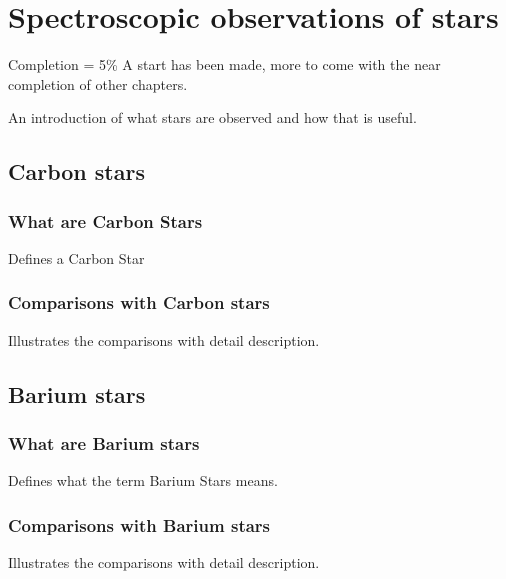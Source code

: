 \chapter{Spectroscopic observations of stars}

Completion = 5\%
A start has been made, more to come with the near completion of other chapters.

An introduction of what stars are observed and how that is useful.

\section{Carbon stars}

\subsection{What are Carbon Stars}

Defines a Carbon Star

\subsection{Comparisons with Carbon stars}

Illustrates the comparisons with detail description.

\section{Barium stars}

\subsection{What are Barium stars}

Defines what the term Barium Stars means.

\subsection{Comparisons with Barium stars}

Illustrates the comparisons with detail description.



